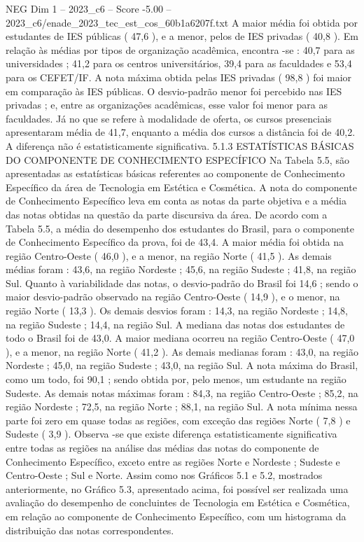 \begin{textsample}{NEG Dim 1 – 2023\_c6 – Score -5.00 – 2023\_c6/enade\_2023\_tec\_est\_cos\_60b1a6207f.txt}
A maior média foi obtida por estudantes de IES públicas ( 47,6 ), e a menor, pelos de IES privadas ( 40,8 ).
Em relação às médias por tipos de organização acadêmica, encontra -se : 40,7 para as universidades ; 41,2 para os centros universitários, 39,4 para as faculdades e 53,4 para os CEFET/IF.
A nota máxima obtida pelas IES privadas ( 98,8 ) foi maior em comparação às IES públicas.
O desvio-padrão menor foi percebido nas IES privadas ; e, entre as organizações acadêmicas, esse valor foi menor para as faculdades.
Já no que se refere à modalidade de oferta, os cursos presenciais apresentaram média de 41,7, enquanto a média dos cursos a distância foi de 40,2.
A diferença não é estatisticamente significativa. 5.1.3 ESTATÍSTICAS BÁSICAS DO COMPONENTE DE CONHECIMENTO ESPECÍFICO Na Tabela 5.5, são apresentadas as estatísticas básicas referentes ao componente de Conhecimento Específico da área de Tecnologia em Estética e Cosmética.
A nota do componente de Conhecimento Específico leva em conta as notas da parte objetiva e a média das notas obtidas na questão da parte discursiva da área.
De acordo com a Tabela 5.5, a média do desempenho dos estudantes do Brasil, para o componente de Conhecimento Específico da prova, foi de 43,4.
A maior média foi obtida na região Centro-Oeste ( 46,0 ), e a menor, na região Norte ( 41,5 ).
As demais médias foram : 43,6, na região Nordeste ; 45,6, na região Sudeste ; 41,8, na região Sul.
Quanto à variabilidade das notas, o desvio-padrão do Brasil foi 14,6 ; sendo o maior desvio-padrão observado na região Centro-Oeste ( 14,9 ), e o menor, na região Norte ( 13,3 ).
Os demais desvios foram : 14,3, na região Nordeste ; 14,8, na região Sudeste ; 14,4, na região Sul.
A mediana das notas dos estudantes de todo o Brasil foi de 43,0.
A maior mediana ocorreu na região Centro-Oeste ( 47,0 ), e a menor, na região Norte ( 41,2 ).
As demais medianas foram : 43,0, na região Nordeste ; 45,0, na região Sudeste ; 43,0, na região Sul.
A nota máxima do Brasil, como um todo, foi 90,1 ; sendo obtida por, pelo menos, um estudante na região Sudeste.
As demais notas máximas foram : 84,3, na região Centro-Oeste ; 85,2, na região Nordeste ; 72,5, na região Norte ; 88,1, na região Sul.
A nota mínima nessa parte foi zero em quase todas as regiões, com exceção das regiões Norte ( 7,8 ) e Sudeste ( 3,9 ).
Observa -se que existe diferença estatisticamente significativa entre todas as regiões na análise das médias das notas do componente de Conhecimento Específico, exceto entre as regiões Norte e Nordeste ; Sudeste e Centro-Oeste ; Sul e Norte.
Assim como nos Gráficos 5.1 e 5.2, mostrados anteriormente, no Gráfico 5.3, apresentado acima, foi possível ser realizada uma avaliação do desempenho de concluintes de Tecnologia em Estética e Cosmética, em relação ao componente de Conhecimento Específico, com um histograma da distribuição das notas correspondentes.

\end{textsample}
